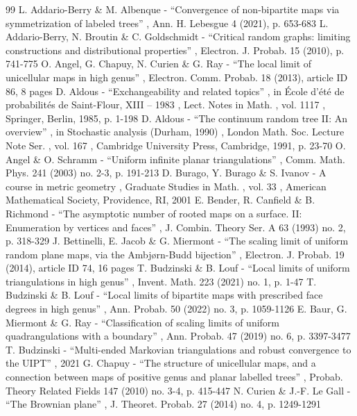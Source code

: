 \documentclass[11pt]{article}
\theoremstyle{plain}
\theoremstyle{definition}
\theoremstyle{remark}
\begin{document}
\begin{thebibliography}{99}
 L. Addario-Berry \& M. Albenque - “Convergence of non-bipartite maps via symmetrization of labeled trees” , Ann. H. Lebesgue 4 (2021), p. 653-683
 L. Addario-Berry, N. Broutin \& C. Goldschmidt - “Critical random graphs: limiting constructions and distributional properties” , Electron. J. Probab. 15 (2010), p. 741-775
 O. Angel, G. Chapuy, N. Curien \& G. Ray - “The local limit of unicellular maps in high genus” , Electron. Comm. Probab. 18 (2013), article ID 86, 8 pages
 D. Aldous - “Exchangeability and related topics” , in École d’été de probabilités de Saint-Flour, XIII – 1983 , Lect. Notes in Math. , vol. 1117 , Springer, Berlin, 1985, p. 1-198
 D. Aldous - “The continuum random tree II: An overview” , in Stochastic analysis (Durham, 1990) , London Math. Soc. Lecture Note Ser. , vol. 167 , Cambridge University Press, Cambridge, 1991, p. 23-70
 O. Angel \& O. Schramm - “Uniform infinite planar triangulations” , Comm. Math. Phys. 241 (2003) no. 2-3, p. 191-213
 D. Burago, Y. Burago \& S. Ivanov - A course in metric geometry , Graduate Studies in Math. , vol. 33 , American Mathematical Society, Providence, RI, 2001
 E. Bender, R. Canfield \& B. Richmond - “The asymptotic number of rooted maps on a surface. II: Enumeration by vertices and faces” , J. Combin. Theory Ser. A 63 (1993) no. 2, p. 318-329
 J. Bettinelli, E. Jacob \& G. Miermont - “The scaling limit of uniform random plane maps, via the Ambjørn-Budd bijection” , Electron. J. Probab. 19 (2014), article ID 74, 16 pages
 T. Budzinski \& B. Louf - “Local limits of uniform triangulations in high genus” , Invent. Math. 223 (2021) no. 1, p. 1-47
 T. Budzinski \& B. Louf - “Local limits of bipartite maps with prescribed face degrees in high genus” , Ann. Probab. 50 (2022) no. 3, p. 1059-1126
 E. Baur, G. Miermont \& G. Ray - “Classification of scaling limits of uniform quadrangulations with a boundary” , Ann. Probab. 47 (2019) no. 6, p. 3397-3477
 T. Budzinski - “Multi-ended Markovian triangulations and robust convergence to the UIPT” , 2021
 G. Chapuy - “The structure of unicellular maps, and a connection between maps of positive genus and planar labelled trees” , Probab. Theory Related Fields 147 (2010) no. 3-4, p. 415-447
 N. Curien \& J.-F. Le Gall - “The Brownian plane” , J. Theoret. Probab. 27 (2014) no. 4, p. 1249-1291

\end{thebibliography}
\end{document}
